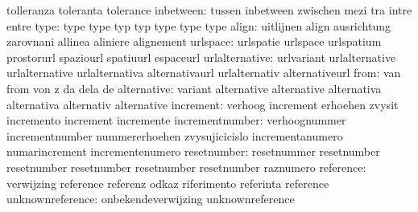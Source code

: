                            tolleranza                toleranta
                           tolerance
                inbetween: tussen                    inbetween
                           zwischen                  mezi
                           tra                       intre
                           entre
                     type: type                      type
                           typ                       typ
                           type                      type
                           type
                    align: uitlijnen                 align
                           ausrichtung               zarovnani
                           allinea                   aliniere
                           alignement
                 urlspace: urlspatie                 urlspace
                           urlspatium                prostorurl
                           spaziourl                 spatiuurl
                           espaceurl
           urlalternative: urlvariant                urlalternative
                           urlalternative            urlalternativa
                           alternativaurl            urlalternativ
                           alternativeurl
                     from: van                       from
                           von                       z
                           da                        dela
                           de
              alternative: variant                   alternative
                           alternative               alternativa
                           alternativa               alternativ
                           alternative
                increment: verhoog                   increment
                           erhoehen                  zvysit
                           incremento                increment
                           incremente
          incrementnumber: verhoognummer             incrementnumber
                           nummererhoehen            zvysujicicislo
                           incrementanumero          numarincrement
                           incrementenumero
              resetnumber: resetnummer               resetnumber
                           resetnumber               resetnumber
                           resetnumber               resetnumber
                           raznumero
                reference: verwijzing                reference
                           referenz                  odkaz
                           riferimento               referinta
                           reference
         unknownreference: onbekendeverwijzing       unknownreference
